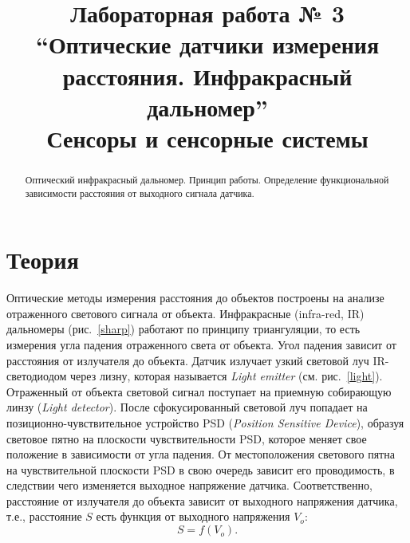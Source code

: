 \documentclass[12pt]{article}
\title{Лабораторная работа № 3 \\
``Оптические датчики измерения расстояния. Инфракрасный дальномер'' \\
\large Сенсоры и сенсорные системы}
\begin{document}
\maketitle
\tableofcontents
\begin{abstract}
    Оптический инфракрасный дальномер. Принцип работы. Определение функциональной зависимости расстояния от выходного сигнала датчика.
\end{abstract}

\section{Теория}

Оптические методы измерения расстояния до объектов построены на анализе отраженного светового сигнала от объекта. Инфракрасные (infra-red, IR) дальномеры (рис.~\ref{sharp}) работают по принципу триангуляции, то есть измерения угла падения отраженного света от объекта. Угол падения зависит от расстояния от излучателя до объекта. Датчик излучает узкий световой луч IR-светодиодом через лизну, которая называется \textit{Light emitter} (см. рис.~\ref{light}). Отраженный от объекта световой сигнал поступает на приемную собирающую линзу (\textit{Light detector}). После сфокусированный световой луч попадает на позиционно-чувствительное устройство PSD (\textit{Position Sensitive Device}), образуя световое пятно на плоскости чувствительности PSD, которое меняет свое положение в зависимости от угла падения. От местоположения светового пятна на чувствительной плоскости PSD в свою очередь зависит его проводимость, в следствии чего изменяется выходное напряжение датчика. Соответственно, расстояние от излучателя до объекта зависит от выходного напряжения датчика, т.е., расстояние \(S\) есть функция от выходного напряжения \(V_{o}\):
\[S=f(V_{o}).\]
\end{document}
